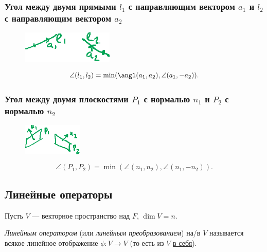\subsubsection{Угол между двумя прямыми $l_1$ с направляющим вектором $a_1$ и $l_2$ с направляющим вектором $a_2$}

{
\begin{figure}
    \vspace{-10pt}
    \includegraphics[height=1.5cm]{lecture27_drawing_5}
\end{figure}

\begin{equation*}
    \angle (l_1, l_2) = \min(\angl(a_1, a_2), \angle(a_1, -a_2))
.\end{equation*}
}

\subsubsection{Угол между двумя плоскостями $P_1$ с нормалью $n_1$ и $P_2$ с нормалью $n_2$}

{
\begin{figure}
    \vspace{-10pt}
    \includegraphics[height=1.5cm]{lecture27_drawing_6}
\end{figure}

\begin{equation*}
    \angle(P_1, P_2) = \min (\angle(n_1, n_2), \angle(n_1, -n_2))
.\end{equation*}
}


\subsection{Линейные операторы}

Пусть $V$ --- векторное пространство над $F$, $\dim V = n$.

\begin{definition}
\textit{Линейным оператором} (или \textit{линейным преобразованием}) на/в $V$ называется всякое линейное отображение $\phi \colon V \to V$ (то есть из $V$ \underline{\underline{в себя}}).
\end{definition}


